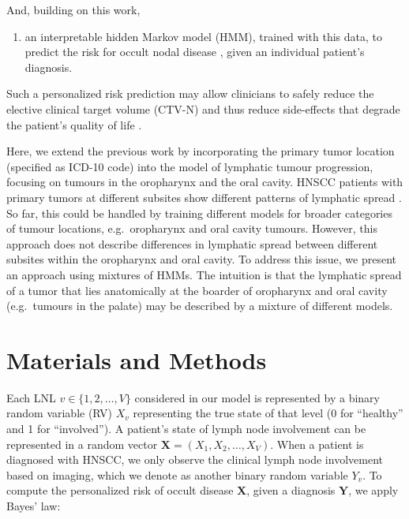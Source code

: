 \documentclass[11pt,twocolumn,twoside]{article}
\providecommand{\tightlist}{%
  \setlength{\itemsep}{0pt}\setlength{\parskip}{0pt}}\usepackage{longtable,booktabs,array}
\begin{document}
And, building on this work,

\begin{enumerate}
\def\labelenumi{\arabic{enumi}.}
\setcounter{enumi}{1}
\tightlist
\item
  an interpretable hidden Markov model (HMM), trained with this data, to
  predict the risk for occult nodal disease
  \autocite{ludwig_hidden_2021}, given an individual patient's
  diagnosis.
\end{enumerate}

Such a personalized risk prediction may allow clinicians to safely
reduce the elective clinical target volume (CTV-N) and thus reduce
side-effects that degrade the patient's quality of life
\autocite{batth_practical_2014}.

Here, we extend the previous work by incorporating the primary tumor
location (specified as ICD-10 code) into the model of lymphatic tumour
progression, focusing on tumours in the oropharynx and the oral cavity.
HNSCC patients with primary tumors at different subsites show different
patterns of lymphatic spread
\autocite{lindberg_distribution_1972,woolgar_histological_1999}. So far,
this could be handled by training different models for broader
categories of tumour locations, e.g.~oropharynx and oral cavity tumours.
However, this approach does not describe differences in lymphatic spread
between different subsites within the oropharynx and oral cavity. To
address this issue, we present an approach using mixtures of HMMs. The
intuition is that the lymphatic spread of a tumor that lies anatomically
at the boarder of oropharynx and oral cavity (e.g.~tumours in the
palate) may be described by a mixture of different models.

\section{Materials and Methods}\label{sec-materials-and-methods}

Each LNL \(v \in \{ 1, 2, \ldots, V\}\) considered in our model is
represented by a binary random variable (RV) \(X_v\) representing the
true state of that level (0 for ``healthy'' and 1 for ``involved''). A
patient's state of lymph node involvement can be represented in a random
vector \(\mathbf{X} = \left( X_1, X_2, \ldots, X_V \right)\). When a
patient is diagnosed with HNSCC, we only observe the clinical lymph node
involvement based on imaging, which we denote as another binary random
variable \(Y_v\). To compute the personalized risk of occult disease
\(\mathbf{X}\), given a diagnosis \(\mathbf{Y}\), we apply Bayes' law:
\end{document}
